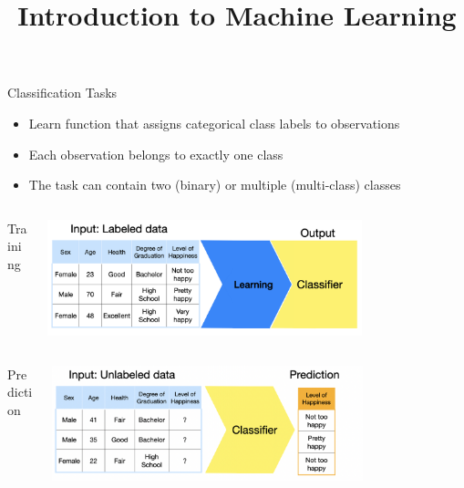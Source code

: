 \documentclass[11pt,compress,t,notes=noshow, xcolor=table]{beamer}
\title{Introduction to Machine Learning}
\date{}
\begin{document}
\sloppy

\begin{vbframe}{Classification Tasks}
\begin{itemize}
\item \small Learn function that assigns categorical class labels to observations
\item \small Each observation belongs to exactly one class
\item \small The task can contain two (binary) or multiple (multi-class) classes
\end{itemize}


\begin{columns}
\begin{column}{0.1\textwidth}
\begin{center}
Training
\end{center}
\end{column}
\begin{column}{0.9\textwidth}
\begin{center}
  \includegraphics[width = 0.75\textwidth]{figure_man/nutshell-classification-training-task}
\end{center}
\end{column}
\end{columns}
\begin{columns}
\begin{column}{0.1\textwidth}
\begin{center}
Prediction
\end{center}
\end{column}
\begin{column}{0.9\textwidth}
\begin{center}
  \includegraphics[width = 0.75\textwidth]{figure_man/nutshell-classification-prediction-task}
\end{center}
\end{column}
\end{columns}
\end{vbframe}
\end{document}
